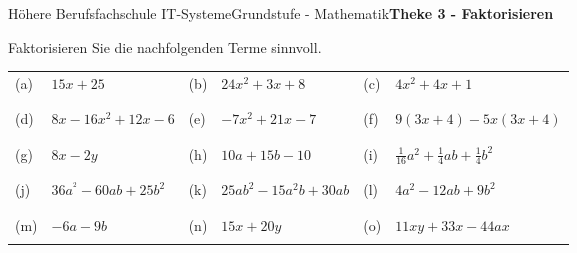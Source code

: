 \documentclass[oneside,openany,headings=optiontotoc,11pt,numbers=noenddot]{scrreprt}
\begin{document}
	\begin{worksheet}{Höhere Berufsfachschule IT-Systeme}{Grundstufe - Mathematik}{\textbf{Theke 3 - Faktorisieren}}
		\begin{framed}
			\noindent
			Faktorisieren Sie die nachfolgenden Terme sinnvoll.\\
			\begin{tabularx}{\textwidth}{lXlXlX}
				\\
				(a) & \(15x+25\) & (b) & \(24x^2+3x+8\) & (c) & \(4x^2+4x+1\)\\
				\\
				\hline
				\\
				(d) & \(8x-16x^2+12x-6\) & (e) & \(-7x^2+21x-7\) & (f) & \(9(3x+4)-5x(3x+4)\)\\
				\\
				\hline
				\\
				(g) & \(8x-2y\) & (h) & \(10a+15b-10\) & (i) & \(\frac{1}{16}a^2+\frac{1}{4}ab+\frac{1}{4}b^2\)\\
				\\
				\hline
				\\
				(j) & \(36a^^2-60ab+25b^2\) & (k) & \(25ab^2 -15a^2b +30ab\) & (l) & \(4a^2-12ab+9b^2\)\\
				\\
				\hline
				\\
				(m) & \(-6a-9b\) & (n) & \(15x+20y\) & (o) & \(11xy+33x-44ax\)\\
				\\
				\hline
			\end{tabularx}
		\end{framed}
	\end{worksheet}
\end{document}

